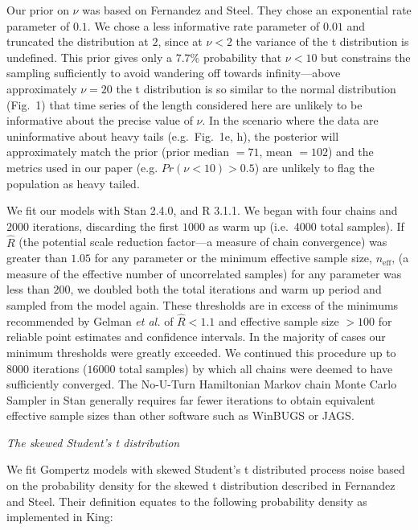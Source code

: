 Our prior on \(\nu\) was based on Fernandez and Steel\cite{fernandez1998}. They chose an exponential rate parameter of \(0.1\). We chose a less informative rate parameter of \(0.01\) and truncated the distribution at \(2\), since at \(\nu < 2\) the variance of the t distribution is undefined. This prior gives only a \(7.7\)\% probability that \(\nu < 10\) but constrains the sampling sufficiently to avoid wandering off towards infinity---above approximately \(\nu = 20\) the t distribution is so similar to the normal distribution (Fig.~1) that time series of the length considered here are unlikely to be informative about the precise value of \(\nu\). In the scenario where the data are uninformative about heavy tails (e.g.~Fig.~1e, h), the posterior will approximately match the prior (prior median \(= 71\), mean \(= 102\)) and the metrics used in our paper (e.g. \(Pr(\nu < 10) > 0.5\)) are unlikely to flag the population as heavy tailed.

We fit our models with Stan 2.4.0\cite{stan-manual2014}, and R 3.1.1\cite{r2014}. We began with four chains and \(2000\) iterations, discarding the first \(1000\) as warm up (i.e.~4000 total samples). If \(\hat{R}\) (the potential scale reduction factor---a measure of chain convergence) was greater than \(1.05\) for any parameter or the minimum effective sample size, \(n_\mathrm{eff}\), (a measure of the effective number of uncorrelated samples) for any parameter was less than \(200\), we doubled both the total iterations and warm up period and sampled from the model again. These thresholds are in excess of the minimums recommended by Gelman \emph{et al.}\cite{gelman2006a} of \(\hat{R} < 1.1\) and effective sample size \(> 100\) for reliable point estimates and confidence intervals. In the majority of cases our minimum thresholds were greatly exceeded. We continued this procedure up to \(8000\) iterations (\(16000\) total samples) by which all chains were deemed to have sufficiently converged. The No-U-Turn Hamiltonian Markov chain Monte Carlo Sampler in Stan generally requires far fewer iterations to obtain equivalent effective sample sizes than other software such as WinBUGS or JAGS\cite{stan-manual2014}.

\emph{The skewed Student's t distribution}

We fit Gompertz models with skewed Student's t distributed process noise based on the probability density for the skewed t distribution described in Fernandez and Steel\cite{fernandez1998}. Their definition equates to the following probability density as implemented in King\cite{king2012}:


